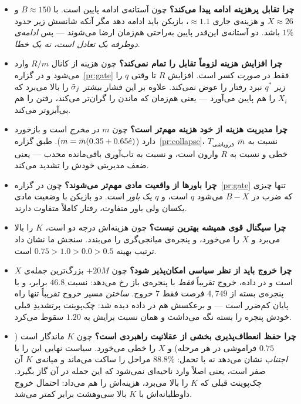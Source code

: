\documentclass[12pt,a4paper]{article}
\begin{document}
\begin{itemize}[leftmargin=1.5em,itemsep=4pt]
  \item \textbf{چرا تقابل پرهزینه ادامه پیدا می‌کند؟}
        چون آستانه‌ی ادامه پایین است. با $B\approx150$ و $X\approx26$ و
        هزینه‌ی جاری $\approx1.1$، بازیکن باید ادامه دهد مگر آنکه شانسش زیر
        حدود $1\%$ باشد. دو آستانه‌ی این‌قدر پایین به‌راحتی هم‌زمان ارضا
        می‌شوند — پس \emph{ادامه‌ی دوطرفه یک تعادل است، نه یک خطا}.
  \item \textbf{چرا افزایش هزینه لزوماً تقابل را تمام نمی‌کند؟}
        چون هزینه از کانال $R/m$ وارد می‌شود و در گزاره~\ref{pr:gate} فقط در
        \emph{صورت} کسر است. افزایش $R$ تا وقتی $q$ را زیر $q^\ast$ نبرد
        رفتار را عوض نمی‌کند. علاوه بر این فشار بیشتر $\tilde{\sigma}_j$ را بالا
        می‌برد که $X_i$ را هم پایین می‌آورد — یعنی هم‌زمان که ماندن را
        گران‌تر می‌کند، رفتن را هم بی‌آبروتر می‌کند.
  \item \textbf{چرا مدیریت هزینه از خود هزینه مهم‌تر است؟}
        چون $m$ در \emph{مخرج} است و بازخورد دارد
        ($m=\bar{m}(0.35+0.65\hat{e})$). طبق گزاره~\ref{pr:collapse}،
        $T_{\text{فروپاشی}}$ نسبت به $\bar{m}$ خطی و نسبت به $R$ وارون است، و
        نسبت به تاب‌آوری باقی‌مانده محدب — یعنی ضعف مدیریتی خودش را تشدید
        می‌کند.
  \item \textbf{چرا باورها از واقعیت مادی مهم‌تر می‌شوند؟}
        چون در گزاره~\ref{pr:gate} تنها چیزی که ضرب در $B-X$ می‌شود $q$ است،
        و $q$ یک \emph{باور} است. دو بازیکن با وضعیت مادی یکسان ولی باور
        متفاوت، رفتار کاملاً متفاوت دارند.
  \item \textbf{چرا سیگنال قوی همیشه بهترین نیست؟}
        چون هزینه‌اش درجه دو است، $K$ را بالا می‌برد و $X$ را می‌خورد، و
        پنجره‌ی میانجی‌گری را می‌بندد. سنجش ما نشان داد ترتیب بهینه
        $0.75>1.0>0.0>0.5$ است.
  \item \textbf{چرا خروج باید از نظر سیاسی امکان‌پذیر شود؟}
        چون $+20M$ بزرگ‌ترین جمله‌ی $X$ است و در داده، خروج تقریباً
        \emph{فقط} با پنجره‌ی باز رخ می‌دهد: نسبت $46.8$ برابر، و با
        پنجره‌ی بسته از $4{,}749$ فرصت فقط $7$ خروج. \emph{ساختن} مسیر
        خروج تقریباً تنها راه پایان کم‌ضرر است — و برعکسش هم در داده
        دیده شد: چک‌پوینت پرتشدیدِ قبلی خودش پنجره را بسته نگه می‌داشت و
        همان نسبت برایش به $1.20$ سقوط می‌کرد.
  \item \textbf{چرا حفظ انعطاف‌پذیری بخشی از عقلانیت راهبردی است؟}
        چون $K$ ماندگار است ($0.75$ فراموشی در هر مرحله) و $X$ را خطی
        می‌خورد. سیاست نهایی این را با \emph{اجتناب} نشان می‌دهد نه با
        تحمل: $88.8\%$ مراحل را ساکت می‌ماند و میانه‌ی $K$ آن صفر است،
        یعنی اصلاً وارد ناحیه‌ای نمی‌شود که این جمله در آن گاز بگیرد.
        چک‌پوینت قبلی که $K$ را بالا می‌برد، هزینه‌اش را هم می‌داد:
        احتمال خروج داوطلبانه‌اش با $K$ بالا سی‌وهشت برابر کمتر می‌شد.
\end{itemize}
\end{document}
